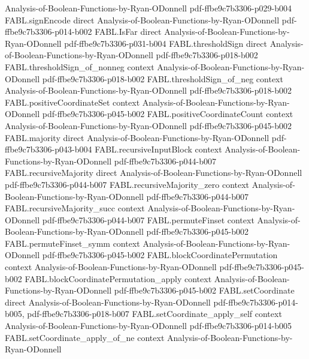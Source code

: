 \begin{theorem}
  {Analysis-of-Boolean-Functions-by-Ryan-ODonnell}
  {pdf-ffbe9c7b3306-p029-b004}
\proofstep
  {FABL.signEncode}
  {direct}
  {Analysis-of-Boolean-Functions-by-Ryan-ODonnell}
  {pdf-ffbe9c7b3306-p014-b002}
\proofstep
  {FABL.IsFar}
  {direct}
  {Analysis-of-Boolean-Functions-by-Ryan-ODonnell}
  {pdf-ffbe9c7b3306-p031-b004}
\proofstep
  {FABL.thresholdSign}
  {direct}
  {Analysis-of-Boolean-Functions-by-Ryan-ODonnell}
  {pdf-ffbe9c7b3306-p018-b002}
\proofstep
  {FABL.thresholdSign_of_nonneg}
  {context}
  {Analysis-of-Boolean-Functions-by-Ryan-ODonnell}
  {pdf-ffbe9c7b3306-p018-b002}
\proofstep
  {FABL.thresholdSign_of_neg}
  {context}
  {Analysis-of-Boolean-Functions-by-Ryan-ODonnell}
  {pdf-ffbe9c7b3306-p018-b002}
\proofstep
  {FABL.positiveCoordinateSet}
  {context}
  {Analysis-of-Boolean-Functions-by-Ryan-ODonnell}
  {pdf-ffbe9c7b3306-p045-b002}
\proofstep
  {FABL.positiveCoordinateCount}
  {context}
  {Analysis-of-Boolean-Functions-by-Ryan-ODonnell}
  {pdf-ffbe9c7b3306-p045-b002}
\proofstep
  {FABL.majority}
  {direct}
  {Analysis-of-Boolean-Functions-by-Ryan-ODonnell}
  {pdf-ffbe9c7b3306-p043-b004}
\proofstep
  {FABL.recursiveInputBlock}
  {context}
  {Analysis-of-Boolean-Functions-by-Ryan-ODonnell}
  {pdf-ffbe9c7b3306-p044-b007}
\proofstep
  {FABL.recursiveMajority}
  {direct}
  {Analysis-of-Boolean-Functions-by-Ryan-ODonnell}
  {pdf-ffbe9c7b3306-p044-b007}
\proofstep
  {FABL.recursiveMajority_zero}
  {context}
  {Analysis-of-Boolean-Functions-by-Ryan-ODonnell}
  {pdf-ffbe9c7b3306-p044-b007}
\proofstep
  {FABL.recursiveMajority_succ}
  {context}
  {Analysis-of-Boolean-Functions-by-Ryan-ODonnell}
  {pdf-ffbe9c7b3306-p044-b007}
\proofstep
  {FABL.permuteFinset}
  {context}
  {Analysis-of-Boolean-Functions-by-Ryan-ODonnell}
  {pdf-ffbe9c7b3306-p045-b002}
\proofstep
  {FABL.permuteFinset_symm}
  {context}
  {Analysis-of-Boolean-Functions-by-Ryan-ODonnell}
  {pdf-ffbe9c7b3306-p045-b002}
\proofstep
  {FABL.blockCoordinatePermutation}
  {context}
  {Analysis-of-Boolean-Functions-by-Ryan-ODonnell}
  {pdf-ffbe9c7b3306-p045-b002}
\proofstep
  {FABL.blockCoordinatePermutation_apply}
  {context}
  {Analysis-of-Boolean-Functions-by-Ryan-ODonnell}
  {pdf-ffbe9c7b3306-p045-b002}
\proofstep
  {FABL.setCoordinate}
  {direct}
  {Analysis-of-Boolean-Functions-by-Ryan-ODonnell}
  {pdf-ffbe9c7b3306-p014-b005,
    pdf-ffbe9c7b3306-p018-b007}
\proofstep
  {FABL.setCoordinate_apply_self}
  {context}
  {Analysis-of-Boolean-Functions-by-Ryan-ODonnell}
  {pdf-ffbe9c7b3306-p014-b005}
\proofstep
  {FABL.setCoordinate_apply_of_ne}
  {context}
  {Analysis-of-Boolean-Functions-by-Ryan-ODonnell}

\end{theorem}
